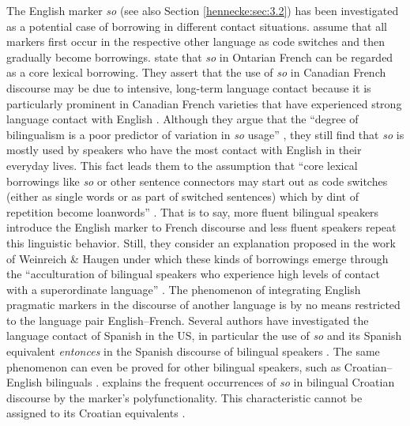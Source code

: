 \documentclass[output=paper]{langscibook}
\begin{document}
The English marker \textit{so} (see also Section \ref{hennecke:sec:3.2}) has been investigated as a potential case of borrowing in different contact situations. \citet{Mougeon.1991} assume that all markers first occur in the respective other language as code switches and then gradually become borrowings. \citet[199]{Mougeon.1991} state that \textit{so} in Ontarian French can be regarded as a core lexical borrowing. They assert that the use of \textit{so} in Canadian French discourse may be due to intensive, long-term language contact because it is particularly prominent in Canadian French varieties that have experienced strong language contact with English \citep[201]{Mougeon.1991}. Although they argue that the “degree of bilingualism is a poor predictor of variation in \textit{so} usage” \citep[201]{Mougeon.1991}, they still find that \textit{so} is mostly used by speakers who have the most contact with English in their everyday lives. This fact leads them to the assumption that “core lexical borrowings like \textit{so} or other sentence connectors may start out as code switches (either as single words or as part of switched sentences) which by dint of repetition become loanwords” \citep[211]{Mougeon.1991}. That is to say, more fluent bilingual speakers introduce the English marker to French discourse and less fluent speakers repeat this linguistic behavior. Still, they consider an explanation proposed in the work of Weinreich \& Haugen under which these kinds of borrowings emerge through the “acculturation of bilingual speakers who experience high levels of contact with a superordinate language” \citep[212]{Mougeon.1991}. The phenomenon of integrating English pragmatic markers in the discourse of another language is by no means restricted to the language pair English–French. Several authors have investigated the language contact of Spanish in the US, in particular the use of \textit{so} and its Spanish equivalent \textit{entonces} in the Spanish discourse of bilingual speakers \citep{SilvaCorvalan.1995,Aaron.2004,Torres.2002,Lipski.2005,Torres.2008}. The same phenomenon can even be proved for other bilingual speakers, such as Croatian–English bilinguals \citep{Hlavac.2006}. \citet{Hlavac.2006} explains the frequent occurrences of \textit{so} in bilingual Croatian discourse by the marker’s polyfunctionality. This characteristic cannot be assigned to its Croatian equivalents \citep[1896]{Hlavac.2006}. 
\end{document}

